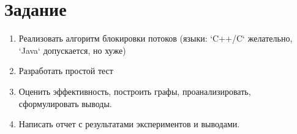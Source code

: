 \section{Задание}

\begin{enumerate}
    \item Реализовать алгоритм блокировки потоков 
    (языки: `C++/C` желательно, `Java` допускается, но хуже)
    \item Разработать простой тест
    \item Оценить эффективность, построить графы, проанализировать, сформулировать выводы.
    \item Написать отчет с результатами экспериментов и выводами.
\end{enumerate}